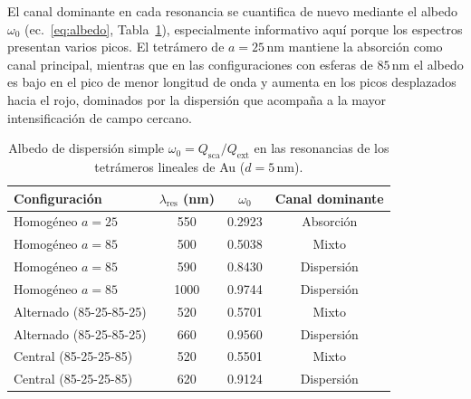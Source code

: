 El canal dominante en cada resonancia se cuantifica de nuevo mediante el albedo
$\omega_0$ (ec.~\ref{eq:albedo}, Tabla~\ref{tab:tetramero_albedo}),
especialmente informativo aquí porque los espectros presentan varios picos. El
tetrámero de $a=25\,\text{nm}$ mantiene la absorción como canal principal,
mientras que en las configuraciones con esferas de $85\,\text{nm}$ el albedo es
bajo en el pico de menor longitud de onda y aumenta en los picos desplazados
hacia el rojo, dominados por la dispersión que acompaña a la mayor
intensificación de campo cercano.

\begin{table}[H]
  \centering
  \small
  \begin{tabular}{lccc}
    \hline
    Configuración & $\lambda_\text{res}$ (nm) & $\omega_0$ & Canal dominante \\
    \hline
    Homogéneo $a=25$       & 550  & 0.2923 & Absorción \\
    \hline
    Homogéneo $a=85$       & 500  & 0.5038 & Mixto \\
    Homogéneo $a=85$       & 590  & 0.8430 & Dispersión \\
    Homogéneo $a=85$       & 1000 & 0.9744 & Dispersión \\
    \hline
    Alternado (85-25-85-25) & 520  & 0.5701 & Mixto \\
    Alternado (85-25-85-25) & 660  & 0.9560 & Dispersión \\
    \hline
    Central (85-25-25-85)   & 520  & 0.5501 & Mixto \\
    Central (85-25-25-85)   & 620  & 0.9124 & Dispersión \\
    \hline
  \end{tabular}
  \caption{Albedo de dispersión simple $\omega_0=Q_\text{sca}/Q_\text{ext}$
           en las resonancias de los tetrámeros lineales de Au ($d=5\,$nm).}
  \label{tab:tetramero_albedo}
\end{table}